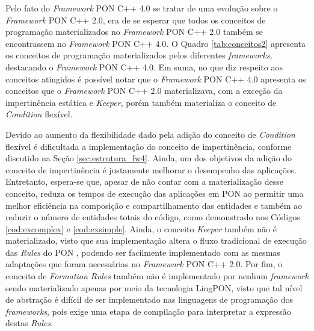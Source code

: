Pelo fato do \textit{Framework} PON C++ 4.0 se tratar de uma evolução sobre o
\textit{Framework} PON C++ 2.0, era de se esperar que todos os conceitos de
programação materializados no \textit{Framework} PON C++ 2.0 também se
encontrassem no \textit{Framework} PON C++ 4.0. O Quadro \ref{tab:conceitos2}
apresenta os conceitos de programação materializados pelos diferentes
\textit{frameworks}, destacando o \textit{Framework} PON C++ 4.0. Em suma, no
que diz respeito aos conceitos atingidos é possível notar que o
\textit{Framework} PON C++ 4.0 apresenta os conceitos que o \textit{Framework}
PON C++ 2.0 materializava, com a exceção da impertinência estática e
\textit{Keeper}, porém também materializa o conceito de \textit{Condition}
flexível.

Devido ao aumento da flexibilidade dado pela adição do conceito de
\textit{Condition} flexível é dificultada a implementação do conceito de
impertinência, conforme discutido na Seção \ref{sec:estrutura_fw4}. Ainda, um
dos objetivos da adição do conceito de impertinência é justamente melhorar o
desempenho das aplicações. Entretanto, espera-se que, apesar de não contar com a
materialização desse conceito, reduza os tempos de execução das aplicações em
PON ao permitir uma melhor eficiência na composição e compartilhamento das
entidades e também ao reduzir o número de entidades totais do código, como
demonstrado nos Códigos \ref{cod:excomplex} e \ref{cod:exsimple}. Ainda, o
conceito \textit{Keeper} também não é materializado, visto que sua implementação
altera o fluxo tradicional de execução das \textit{Rules} do PON
\cite{muchalski_2012}, podendo ser facilmente implementado com as mesmas
adaptações que foram necessárias no \textit{Framework} PON C++ 2.0. Por fim, o
conceito de \textit{Formation Rules} também não é implementado por nenhum
\textit{framework} sendo materializado apenas por meio da tecnologia LingPON,
visto que tal nível de abstração é difícil de ser implementado nas linguagens de
programação dos \textit{frameworks}, pois exige uma etapa de compilação para
interpretar a expressão destas \textit{Rules}.

